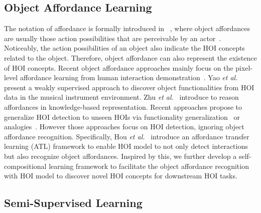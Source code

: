 \documentclass[runningheads]{llncs}
\newcommand{\etal}{\textit{et al.}}
\begin{document}
\subsection{Object Affordance Learning}

The notation of affordance is formally introduced in ~\cite{gibson1979The}, where object affordances are usually those action possibilities that are perceivable by an actor~\cite{norman2002the,gibson1979The,gibson2014ecological}. Noticeably, the action possibilities of an object also indicate the HOI concepts related to the object. Therefore, object affordance can also represent the existence of HOI concepts. Recent object affordance approaches mainly focus on the pixel-level affordance learning from human interaction demonstration~\cite{kjellstrom2011visual,Fouhey2014PeopleWH,fang2018demo2vec,hassan2015attribute,nagarajan2020learning,deng20213d,zhai2021one}. Yao \etal~\cite{Yao2013Discovering} present a weakly supervised approach to discover object functionalities from HOI data in the musical instrument environment. Zhu \etal~\cite{zhu2014reasoning} introduce to reason affordances in knowledge-based representation. Recent approaches propose to generalize HOI detection to unseen HOIs via functionality generalization~\cite{bansal2020detecting} or analogies~\cite{preye2019detecting}. However those approaches focus on HOI detection, ignoring object affordance recognition. Specifically, Hou \etal~\cite{hou2021atl} introduce an affordance transfer learning (ATL) framework to enable HOI model to not only detect interactions but also recognize object affordances.
Inspired by this, we further develop a self-compositional learning framework to facilitate the object affordance recognition with HOI model to discover novel HOI concepts for downstream HOI tasks.


\subsection{Semi-Supervised Learning}
\end{document}
